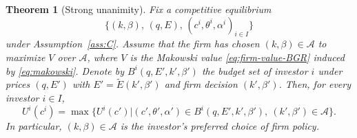 \documentclass[11pt,a4paper,oneside]{book}
\theoremstyle{plain}
\newtheorem{theorem}{Theorem}[chapter]
\theoremstyle{definition}
\theoremstyle{remark}
\numberwithin{equation}{chapter}
\begin{document}
\begin{theorem}[Strong unanimity]\label{thm:strong-unanimity-BGR}
Fix a competitive equilibrium
\begin{equation*}
  \bigl\{ (k, \beta), \, (q, E), \, (c^i, \theta^i, \alpha^i)_{i \in I} \bigr\}
\end{equation*}
under Assumption~\ref{ass:C}.
Assume that the firm has chosen $(k, \beta) \in \mathcal{A}$ to maximize $V$ over $\mathcal{A}$, where $V$ is the Makowski value \eqref{eq:firm-value-BGR} induced by \eqref{eq:makowski}.
Denote by $B^i(q, E', k', \beta')$ the budget set of investor $i$ under prices $(q, E')$ with $E' = \widetilde{E}(k', \beta')$ and firm decision $(k', \beta')$.
Then, for every investor $i \in I$,
\begin{equation}\label{eq:strong-unanimity-BGR}
  U^i(c^i) = \max \bigl\{ U^i(c') \vert (c', \theta', \alpha') \in B^i(q, E', k', \beta'), \ (k', \beta') \in \mathcal{A} \bigr\}.
\end{equation}
In particular, $(k, \beta) \in \mathcal{A}$ is the investor's preferred choice of firm policy.
\end{theorem}
\end{document}
